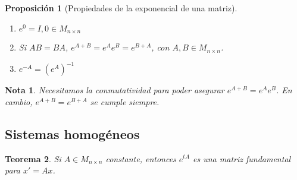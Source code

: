 \documentclass[11pt]{article}
\theoremstyle{theorem-style}  %
\newtheorem{theorem}{Teorema}[section]  %
\newtheorem{proposition}[theorem]{Proposición}
\theoremstyle{definition-style}
\newtheorem*{note}{Nota} %
\theoremstyle{example-style}
\begin{document}
\begin{proposition}[Propiedades de la exponencial de una matriz] \ 
	\begin{enumerate}[\quad i)]
		\item $ e^0 =I, 0 \in M_{n\times n}$
		\item Si $ AB=BA $, $ e^{A+B}=e^Ae^B=e^{B+A} $, con $ A,B\in M_{n\times n} $. 
		\item $ e^{-A}=(e^A)^{-1} $
	\end{enumerate}
\end{proposition}
\begin{note}
	Necesitamos la conmutatividad para poder asegurar  $ e^{A+B}=e^Ae^B$. En cambio, $ e^{A+B}=e^{B+A} $ se cumple siempre.
\end{note}
\subsection{Sistemas homogéneos}
\begin{theorem}
	Si $ A\in M_{n\times n} $ constante, entonces $ e^{tA} $ es una matriz fundamental para $ x'=Ax $.
\end{theorem}
\end{document}
